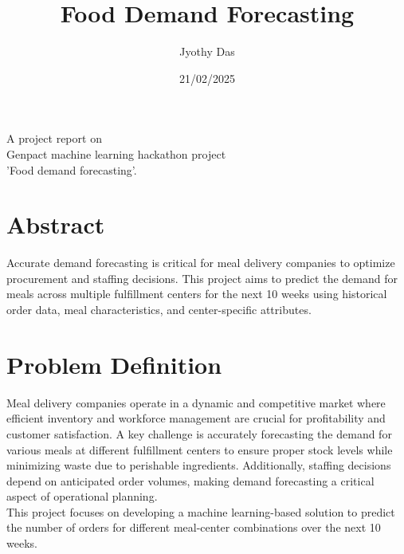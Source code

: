 \documentclass[12pt]{article}
\begin{document}

\title{\textbf{Food Demand Forecasting}}

\author{ Jyothy Das}
\date{21/02/2025}
\maketitle

\vspace{30pt}
\begin{center}
A project report on\\
Genpact machine learning hackathon project\\
'Food demand forecasting'.\\
\end{center}






\newpage
\tableofcontents
\newpage
\listoffigures
\newpage
\listoftables






\newpage
\section{Abstract}
Accurate demand forecasting is critical for meal delivery companies to optimize procurement and staffing decisions.
 This project aims to predict the demand for meals across multiple fulfillment centers for the next 10 weeks using 
historical order data, meal characteristics, and center-specific attributes. 


\newpage
\section{Problem Definition}
Meal delivery companies operate in a dynamic and competitive market where efficient inventory and workforce
 management are crucial for profitability and customer satisfaction. A key challenge is accurately forecasting the 
demand for various meals at different fulfillment centers to ensure proper stock levels while minimizing waste due 
to perishable ingredients. Additionally, staffing decisions depend on anticipated order volumes, making demand 
forecasting a critical aspect of operational planning.\\
This project focuses on developing a machine learning-based solution to predict the number of orders for different 
meal-center combinations over the next 10 weeks.
\end{document}
